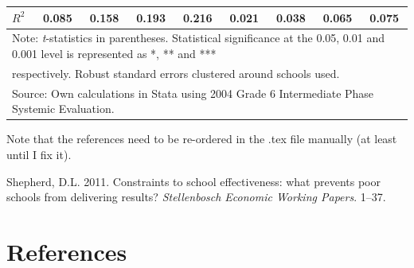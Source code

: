 \documentclass[12pt,preprint, authoryear]{article}
\numberwithin{equation}{section}
\numberwithin{figure}{section}
\numberwithin{table}{section}
\begin{document}
\begin{longtable}[htbp] {p{5cm}*{4}{c}|*{4}{c}}
\(R^{2}\)       &    0.085         &    0.158         &    0.193         &    0.216         &    0.021         &    0.038         &    0.065         &    0.075         \\
\hline\hline
\multicolumn{9}{l}{Note: \textit{t}-statistics in parentheses. Statistical significance at the 0.05, 0.01 and 0.001 level is represented as *, ** and ***} \\
\multicolumn{9}{l}{ respectively. Robust standard errors clustered around schools used.}\\
\multicolumn{9}{l}{Source: Own calculations in Stata using 2004 Grade 6 Intermediate Phase Systemic Evaluation.}\\
\end{longtable}

\normalsize

\newpage

Note that the references need to be re-ordered in the .tex file manually
(at least until I fix it).

\hypertarget{refs}{}
\hypertarget{ref-Shepherd2011}{}
Shepherd, D.L. 2011. Constraints to school effectiveness: what prevents
poor schools from delivering results? \emph{Stellenbosch Economic
Working Papers}. 1--37.

\newcommand\wordcount{
    \immediate\write18{texcount -sub=section \jobname.tex  | grep "Section" |     sed -e 's/+.*//' | sed -n \thesection p > 'count.txt'}
(words)}

\section*{References}
\end{document}

